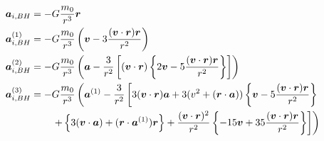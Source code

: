 \begin{align}
    \boldsymbol{a}_{i,BH}       &= -G\frac{m_{0}}{r^{3}} \boldsymbol{r}\\
    \boldsymbol{a}_{i,BH}^{(1)} &= -G\frac{m_{0}}{r^{3}} \left(\boldsymbol{v} - 3 \frac{(\boldsymbol{v}\cdot\boldsymbol{r})\boldsymbol{r}}{r^{2}} \right) \\
    \boldsymbol{a}_{i,BH}^{(2)} &= -G\frac{m_{0}}{r^{3}} \left( \boldsymbol{a} - \frac{3}{r^{2}}
                                                    \left[ (\boldsymbol{v}\cdot\boldsymbol{r})
                                                        \left\{
                                                            2\boldsymbol{v} - 5 \frac{(\boldsymbol{v}\cdot\boldsymbol{r})\boldsymbol{r}}{r^{2}}
                                                        \right\}
                                                    \right]
                                                 \right) \\
    \boldsymbol{a}_{i,BH}^{(3)} &= -G\frac{m_{0}}{r^{3}} \left( \boldsymbol{a}^{(1)} - \frac{3}{r^{2}}
                                                    \left[
                                                        3 (\boldsymbol{v}\cdot\boldsymbol{r})\boldsymbol{a} + 3 (v^{2} + (\boldsymbol{r}\cdot \boldsymbol{a}))
                                                        \left\{ \boldsymbol{v} - 5 \frac{(\boldsymbol{v}\cdot\boldsymbol{r})\boldsymbol{r}}{r^{2}}       \right\} \nonumber \right.\right.\\
                                                        &\qquad {} \left.\left. +\left\{ 3 (\boldsymbol{v}\cdot\boldsymbol{a}) + (\boldsymbol{r}\cdot\boldsymbol{a}^{(1)}) \boldsymbol{r} \right\} +
                                                        \frac{(\boldsymbol{v}\cdot\boldsymbol{r})^{2}}{r^{2}}
                                                        \left\{-15 \boldsymbol{v} + 35\frac{(\boldsymbol{v}\cdot\boldsymbol{r}) \boldsymbol{r}}{r^{2}}  \right\}
                                                    \right]
                                                 \right)
\end{align}
